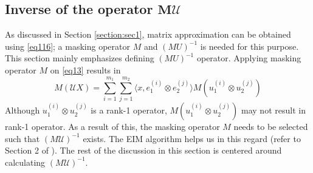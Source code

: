 \documentclass{article}
\begin{document}
\subsection{Inverse of the operator $\mathbf{M\mathcal{U}}$}
As discussed in Section \ref{section:sec1}, matrix approximation can be obtained using \eqref{eq116}; a masking operator $M$ and $(MU)^{-1}$ is needed for this purpose. This section mainly emphasizes defining $(MU)^{-1}$ operator. Applying masking operator $M$ on \eqref{eq13} results in
\begin{equation*} 
M(\mathcal{U}X)=\sum_{i=1}^{m_1}\sum_{j=1}^{m_2} \langle x, e_1^{(i)} \otimes e_2^{(j)}\rangle M(u_1^{(i)} \otimes u_2^{(j)})
\end{equation*}
Although $u_1^{(i)} \otimes u_2^{(j)}$ is a rank-1 operator, $M(u_1^{(i)} \otimes u_2^{(j)})$ may not result in rank-1 operator. As a result of this, the masking operator $M$ needs to be selected such that $(M\mathcal{U})^{-1}$ exists. The EIM algorithm helps us in this regard (refer to Section 2 of \cite{EIM}). The rest of the discussion in this section is centered around calculating $(M\mathcal{U})^{-1}$.
\end{document}

